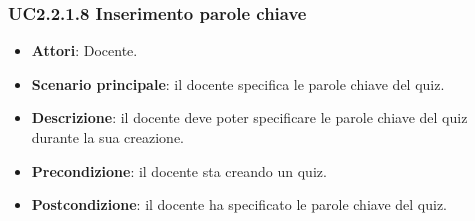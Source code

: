 \subsubsection{UC2.2.1.8 Inserimento parole chiave}
\begin{itemize}
\item \textbf{Attori}: Docente.
\item \textbf{Scenario principale}: il docente specifica le parole chiave del quiz.
\item \textbf{Descrizione}: il docente deve poter specificare le parole chiave del quiz durante la sua creazione.
\item \textbf{Precondizione}: il docente sta creando un quiz.
\item \textbf{Postcondizione}: il docente ha specificato le parole chiave del quiz.
\end{itemize}
